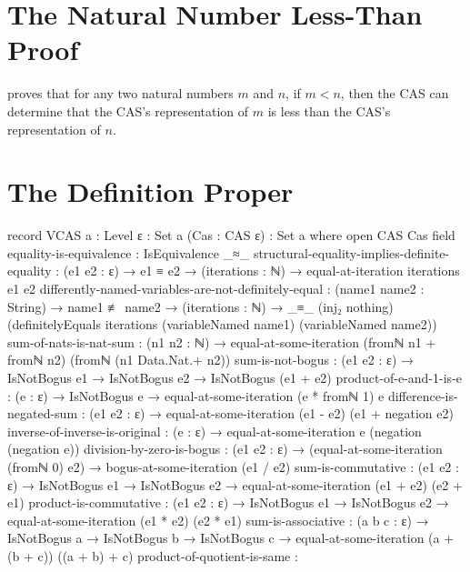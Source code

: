 \documentclass{report}
\begin{document}
\section{The Natural Number Less-Than Proof}
  proves that for any two natural numbers \(m\) and \(n\), if \(m < n\), then the  CAS can determine that the  CAS's representation of \(m\) is less than the  CAS's representation of \(n\).

\section{The Definition Proper}

\begin{code}
record VCAS {a : Level} {ε : Set a} (Cas : CAS ε) : Set a where
  open CAS Cas
  field
    equality-is-equivalence : IsEquivalence _≈_
    structural-equality-implies-definite-equality :
      (e1 e2 : ε) →
      e1 ≡ e2 →
      (iterations : ℕ) →
      equal-at-iteration iterations e1 e2
    differently-named-variables-are-not-definitely-equal :
      (name1 name2 : String) →
      name1 ≢ name2 →
      (iterations : ℕ) →
      _≡_ (inj₂ nothing)
          (definitelyEquals iterations
                            (variableNamed name1)
                            (variableNamed name2))
    sum-of-nats-is-nat-sum :
      (n1 n2 : ℕ) →
      equal-at-some-iteration (fromℕ n1 + fromℕ n2) (fromℕ (n1 Data.Nat.+ n2))
    sum-is-not-bogus :
      (e1 e2 : ε) →
      IsNotBogus e1 →
      IsNotBogus e2 →
      IsNotBogus (e1 + e2)
    product-of-e-and-1-is-e :
      (e : ε) →
      IsNotBogus e →
      equal-at-some-iteration (e * fromℕ 1) e
    difference-is-negated-sum :
      (e1 e2 : ε) →
      equal-at-some-iteration (e1 - e2)
                              (e1 + negation e2)
    inverse-of-inverse-is-original :
      (e : ε) →
      equal-at-some-iteration e (negation (negation e))
    division-by-zero-is-bogus :
      (e1 e2 : ε) →
      (equal-at-some-iteration (fromℕ 0) e2) →
      bogus-at-some-iteration (e1 / e2)
    sum-is-commutative :
      (e1 e2 : ε) →
      IsNotBogus e1 →
      IsNotBogus e2 →
      equal-at-some-iteration (e1 + e2) (e2 + e1)
    product-is-commutative :
      (e1 e2 : ε) →
      IsNotBogus e1 →
      IsNotBogus e2 →
      equal-at-some-iteration (e1 * e2) (e2 * e1)
    sum-is-associative :
      (a b c : ε) →
      IsNotBogus a →
      IsNotBogus b →
      IsNotBogus c →
      equal-at-some-iteration (a + (b + c)) ((a + b) + c)
    product-of-quotient-is-same :

\end{code}
\end{document}
